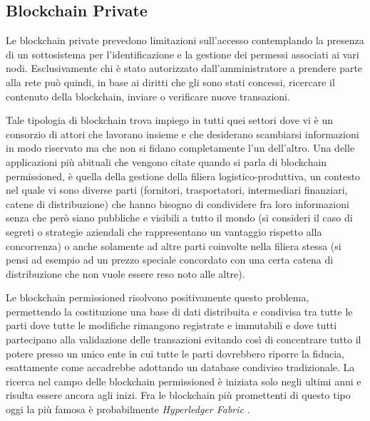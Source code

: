 \subsection{Blockchain Private}
Le blockchain private prevedono limitazioni sull'accesso contemplando la presenza di un sottosistema per l'identificazione e la gestione dei permessi associati ai vari nodi. Esclusivamente chi è stato autorizzato dall'amministratore a prendere parte alla rete può quindi, in base ai diritti che gli sono stati concessi, ricercare il contenuto della blockchain, inviare o verificare nuove transazioni.

Tale tipologia di blockchain trova impiego in tutti quei settori dove vi è un consorzio di attori che lavorano insieme e che desiderano scambiarsi informazioni in modo riservato ma che non si fidano completamente l'un dell'altro. Una delle applicazioni più abituali che vengono citate quando si parla di blockchain permissioned, è quella della gestione della filiera logistico-produttiva, un contesto nel quale vi sono diverse parti (fornitori, trasportatori, intermediari finanziari, catene di distribuzione) che hanno bisogno di condividere fra loro informazioni senza che però siano pubbliche e visibili a tutto il mondo (si consideri il caso di segreti o strategie aziendali che rappresentano un vantaggio rispetto alla concorrenza) o anche solamente ad altre parti coinvolte nella filiera stessa (si pensi ad esempio ad un prezzo speciale concordato con una certa catena di distribuzione che non vuole essere reso noto alle altre).

Le blockchain permissioned risolvono positivamente questo problema, permettendo la costituzione una base di dati distribuita e condivisa tra tutte le parti dove tutte le modifiche rimangono registrate e immutabili e dove tutti partecipano alla validazione delle transazioni evitando così di concentrare tutto il potere presso un unico ente in cui tutte le parti dovrebbero riporre la fiducia, esattamente come accadrebbe adottando un database condiviso tradizionale. La ricerca nel campo delle blockchain permissioned è iniziata solo negli ultimi anni e risulta essere ancora agli inizi. Fra le blockchain più promettenti di questo tipo oggi la più famosa è probabilmente \textit{Hyperledger Fabric} \cite{10.1145/3190508.3190538}.


